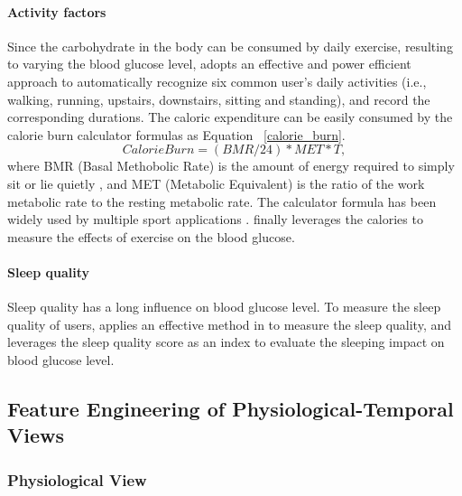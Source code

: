 \paragraph{Activity factors}
Since the carbohydrate in the body can be consumed by daily exercise, resulting to varying the blood glucose level, \sysname adopts an effective and power efficient approach \cite{bib:kwapisz2011activity} to automatically recognize six common user's daily activities (i.e., walking, running, upstairs, downstairs, sitting and standing), and record the corresponding durations. The caloric expenditure can be easily consumed by the calorie burn calculator formulas as Equation ~\ref{calorie_burn}.
\begin{equation}\label{calorie_burn}
  Calorie Burn = (BMR/24)*MET*T,
\end{equation}
where BMR (Basal Methobolic Rate) is the amount of energy required to simply sit or lie quietly \cite{bib:mcnab1997utility}, and MET (Metabolic Equivalent) is the ratio of the work metabolic rate to the resting metabolic rate\cite{bib:ainsworth2000compendium}. The calculator formula has been widely used by multiple sport applications \cite{bib:shapesense, bib:HealthStatus, bib:CalorieCounter}.
\sysname finally leverages the calories to measure the effects of exercise on the blood glucose.

\paragraph{Sleep quality}
Sleep quality has a long influence on blood glucose level. To measure the sleep quality of users, \sysname applies an effective method in \cite{bib:gu2014intelligent} to measure the sleep quality, and leverages the sleep quality score as an index to evaluate the sleeping impact on blood glucose level.

\subsection{Feature Engineering of Physiological-Temporal Views }
\subsubsection{Physiological View}


